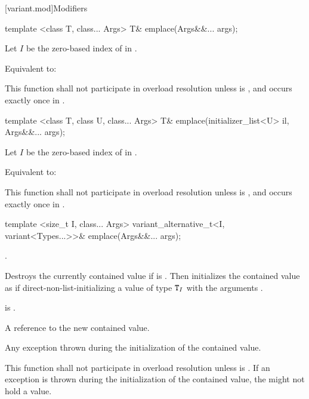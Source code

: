 [variant.mod]{Modifiers}

%
\begin{itemdecl}
template <class T, class... Args> T& emplace(Args&&... args);
\end{itemdecl}

\begin{itemdescr}
\pnum
Let $I$ be the zero-based index of  in .

\pnum
\effects
Equivalent to: 

\pnum
\remarks
This function shall not participate in overload resolution unless
 is , and  occurs
exactly once in .
\end{itemdescr}

%
\begin{itemdecl}
template <class T, class U, class... Args> T& emplace(initializer_list<U> il, Args&&... args);
\end{itemdecl}

\begin{itemdescr}
\pnum
Let $I$ be the zero-based index of  in .

\pnum
\effects
Equivalent to: 

\pnum
\remarks
This function shall not participate in overload resolution unless
 is ,
and  occurs exactly once in .
\end{itemdescr}

%
\begin{itemdecl}
template <size_t I, class... Args>
  variant_alternative_t<I, variant<Types...>>& emplace(Args&&... args);
\end{itemdecl}

\begin{itemdescr}
\pnum
\requires
{}.

\pnum
\effects
Destroys the currently contained value if 
is .
Then initializes the contained value as if direct-non-list-initializing
a value of type $\texttt{T}_I$
with the arguments .

\pnum
\postconditions
{} is .

\pnum
\returns
A reference to the new contained value.

\pnum
\throws
Any exception thrown during the initialization of the contained value.

\pnum
\remarks
This function shall not participate in overload resolution unless
 is .
If an exception is thrown during the initialization of the contained value,
the  might not hold a value.
\end{itemdescr}

